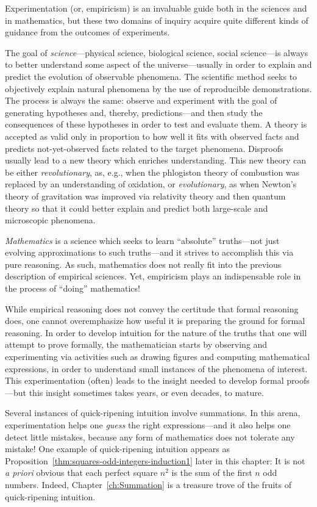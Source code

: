 \noindent
Experimentation (or, empiricism) is an invaluable guide both in the sciences and in mathematics, but these two domains of inquiry acquire quite different kinds of guidance from the outcomes of experiments.

The goal of {\em science}---physical science, biological science, social science---is always to better understand some aspect of the universe---usually in order to explain and predict the evolution of observable phenomena.  The scientific method seeks to objectively explain natural phenomena by the use of reproducible demonstrations.  The process is always the same: observe and experiment with the goal of generating hypotheses and, thereby, predictions---and then study the consequences of these hypotheses in order to test and evaluate them.  A theory is accepted as valid only in proportion to how well it fits with observed facts and predicts not-yet-observed facts related to the target phenomena.  Disproofs usually lead to a new theory which enriches understanding.  This new theory can be either {\em revolutionary}, as, e.g., when the phlogiston theory of combustion was replaced by an understanding of oxidation, or {\em evolutionary}, as when Newton's theory of gravitation was improved via relativity theory and then quantum theory so that it could better explain and predict both large-scale and microscopic phenomena.

\smallskip

{\em Mathematics} is a science which seeks to learn ``absolute'' truths---not just evolving approximations to such truths---and it strives to accomplish this via pure reasoning.  As such, mathematics does not really fit into the previous description of empirical sciences.  Yet, empiricism plays an indispensable role in the process of ``doing'' mathematics!

While empirical reasoning does not convey the certitude that formal reasoning does, one cannot overemphasize how useful it is preparing the ground for formal reasoning.  In order to develop intuition for the nature of the truths that one will attempt to prove formally, the mathematician starts by observing and experimenting via activities such as drawing figures and computing mathematical expressions, in order to understand small instances of the phenomena of interest. This experimentation (often) leads to the insight needed to develop formal proofs---but this insight sometimes takes years, or even decades, to mature.

Several instances of quick-ripening intuition involve summations.  In this arena, experimentation helps one \textit{guess} the right expressions---and it also helps one detect little mistakes, because any form of mathematics does not tolerate any mistake!  One example of quick-ripening intuition appears as Proposition~\ref{thm:squares-odd-integers-induction1} later in this
chapter: It is not {\em a priori} obvious that each perfect square $n^2$ is the sum of the first $n$ odd numbers.  Indeed, Chapter~\ref{ch:Summation} is a treasure trove of the fruits of
quick-ripening intuition.


